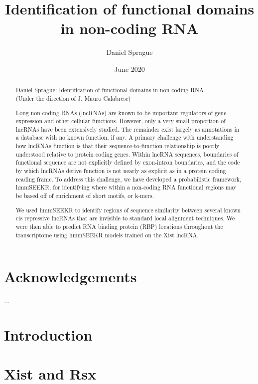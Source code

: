\documentclass[12pt,left=2in,right=1in,top=1in,bottom=1in]{report}
\title{
    {Identification of functional domains \linebreak in non-coding RNA}\\
    }
\author{Daniel Sprague}
\date{June 2020}
\begin{document}
\maketitle
\begin{abstract}
\begin{center}
Daniel Sprague: Identification of functional domains in non-coding RNA\\
(Under the direction of J. Mauro Calabrese)
\end{center}
Long non-coding RNAs (lncRNAs) are known to be important regulators of gene expression and other cellular functions. However, only a very small proportion of lncRNAs have been extensively studied. The remainder exist largely as annotations in a database with no known function, if any. A primary challenge with understanding how lncRNAs function is that their sequence-to-function relationship is poorly understood relative to protein coding genes. Within lncRNA sequences, boundaries of functional sequence are not explicitly defined by exon-intron boundaries, and the code by which lncRNAs derive function is not nearly as explicit as in a protein coding reading frame. To address this challenge, we have developed a probabilistic framework, hmmSEEKR, for identifying where within a non-coding RNA functional regions may be based off of enrichment of short motifs, or k-mers. 

We used hmmSEEKR to identify regions of sequence similarity between several known cis repressive lncRNAs that are invisible to standard local alignment techniques. We were then able to predict RNA binding protein (RBP) locations throughout the transcriptome using hmmSEEKR models trained on the Xist lncRNA.
\end{abstract}
\chapter*{\center Acknowledgements}
\begin{center}
...
\end{center}
\tableofcontents
\chapter{Introduction}


\chapter{Xist and Rsx}

\end{document}
